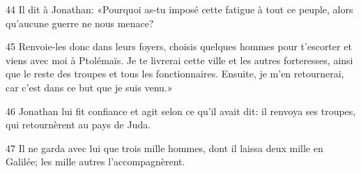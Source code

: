
44 Il dit à Jonathan: «Pourquoi as-tu imposé cette fatigue à tout ce peuple, alors qu’aucune guerre ne nous menace?

45 Renvoie-les donc dans leurs foyers, choisis quelques hommes pour t’escorter et viens avec moi à Ptolémaïs. Je te livrerai cette ville et les autres forteresses, ainsi que le reste des troupes et tous les fonctionnaires. Ensuite, je m’en retournerai, car c’est dans ce but que je suis venu.»

46 Jonathan lui fit confiance et agit selon ce qu’il avait dit: il renvoya ses troupes, qui retournèrent au pays de Juda.

47 Il ne garda avec lui que trois mille hommes, dont il laissa deux mille en Galilée; les mille autres l’accompagnèrent.
